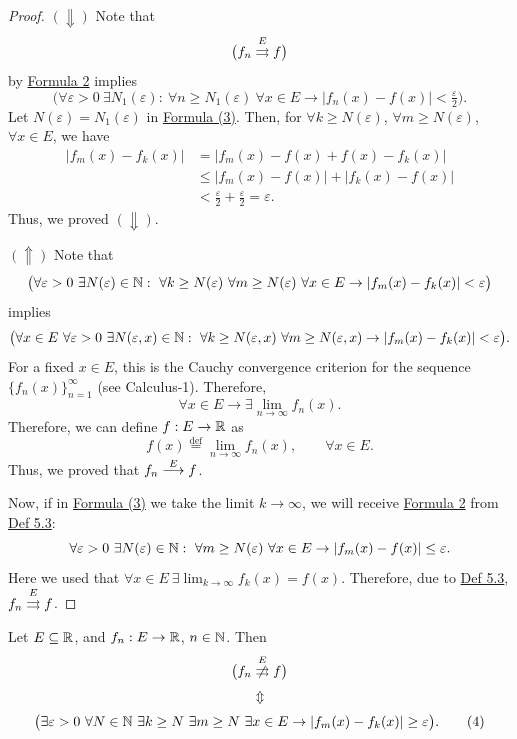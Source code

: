 \begin{proof}
$(\Downarrow)$ Note that
\[
\bigl(f_n\mathrel{\overset{E}{\rightrightarrows}}f\bigr)
\]
by \hyperref[eq:5:2:1]{Formula 2} implies
\[
\bigl(\forall\varepsilon>0\ \exists N_1(\varepsilon):\ \forall n\ge N_1(\varepsilon)\ \forall x\in E
\to |f_n(x)-f(x)|<\tfrac{\varepsilon}{2}\bigr).
\]
Let $N(\varepsilon)=N_1(\varepsilon)$ in \hyperref[eq:5:3:1]{Formula (3)}. Then, for $\forall k\ge N(\varepsilon)$, $\forall m\ge N(\varepsilon)$, $\forall x\in E$, we have
\begin{align*}
|f_m(x)-f_k(x)|
&=|f_m(x)-f(x)+f(x)-f_k(x)|\\
&\le |f_m(x)-f(x)|+|f_k(x)-f(x)|\\
&<\frac{\varepsilon}{2}+\frac{\varepsilon}{2}=\varepsilon.
\end{align*}
Thus, we proved $(\Downarrow)$.

$(\Uparrow)$ Note that
\[
\bigl(\forall\varepsilon>0\ \exists N(\varepsilon)\in\N:\ \forall k\ge N(\varepsilon)\ \forall m\ge N(\varepsilon)\ \forall x\in E
\to |f_m(x)-f_k(x)|<\varepsilon\bigr)
\]
implies
\[
\bigl(\forall x\in E\ \forall\varepsilon>0\ \exists N(\varepsilon,x)\in\N:\ \forall k\ge N(\varepsilon,x)\ \forall m\ge N(\varepsilon,x)
\to |f_m(x)-f_k(x)|<\varepsilon\bigr).
\]
For a fixed $x\in E$, this is the Cauchy convergence criterion for the sequence $\{f_n(x)\}_{n=1}^{\infty}$ (see Calculus-1). Therefore,
\[
\forall x\in E\to\exists\lim_{n\to\infty}f_n(x).
\]
Therefore, we can define $f:E\to\mathbb{R}$ as
\[
f(x)\overset{\mathrm{def}}{=}\lim_{n\to\infty}f_n(x),\qquad \forall x\in E.
\]
Thus, we proved that $f_n\mathrel{\overset{E}{\longrightarrow}}f$.

Now, if in \hyperref[eq:5:3:1]{Formula (3)} we take the limit $k\to\infty$, we will receive \hyperref[eq:5:2:1]{Formula 2} from \hyperref[def:5.3]{Def 5.3}:
\[
\forall\varepsilon>0\ \exists N(\varepsilon)\in\mathbb{N}:\ \forall m\ge N(\varepsilon)\ \forall x\in E
\to |f_m(x)-f(x)|\le\varepsilon.
\]
Here we used that $\forall x\in E\ \exists\lim_{k\to\infty}f_k(x)=f(x)$.
Therefore, due to \hyperref[def:5.3]{Def 5.3}, $f_n\mathrel{\overset{E}{\rightrightarrows}}f$.
\end{proof}

\begin{claim}\label{claim:5.5}
Let $E\subseteq\mathbb{R}$, and $f_n:E\to\mathbb{R}$, $n\in\mathbb{N}$.
Then
\[
\bigl(f_n\nuconv{E}f\bigr)
\]
\[
\Updownarrow
\]
\[
\bigl(\exists\varepsilon>0\ \forall N\in\mathbb{N}\ \exists k\ge N\ \exists m\ge N\ \exists x\in E
\to |f_m(x)-f_k(x)|\ge\varepsilon\bigr).
\tag{4}\label{eq:5:4:1}
\]
\end{claim}

